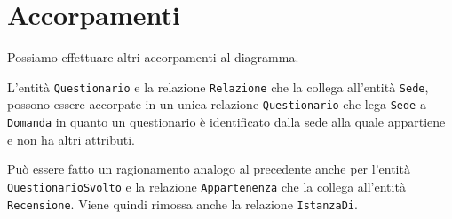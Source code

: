 \section{Accorpamenti}\label{sec:mergers}
Possiamo effettuare altri accorpamenti al diagramma.

\vspace{10pt}
L'entità {\tt Questionario} e la relazione {\tt Relazione} che la collega all'entità {\tt Sede},
possono essere accorpate in un unica relazione {\tt Questionario} che lega {\tt Sede}
a {\tt Domanda} in quanto un questionario è identificato dalla sede alla quale appartiene
e non ha altri attributi.

Può essere fatto un ragionamento analogo al precedente anche per l'entità {\tt QuestionarioSvolto}
e la relazione {\tt Appartenenza} che la collega all'entità {\tt Recensione}. Viene
quindi rimossa anche la relazione {\tt IstanzaDi}.
